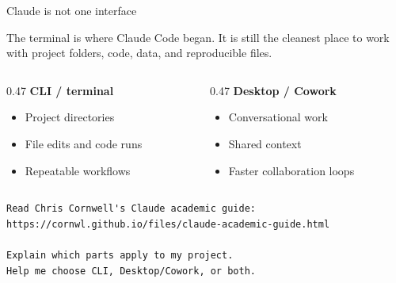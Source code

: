 \documentclass[aspectratio=169,11pt]{beamer}
\begin{document}
\begin{frame}[fragile]{Claude is not one interface}

The terminal is where Claude Code began. It is still the cleanest place to work with project folders, code, data, and reproducible files.

\vspace{0.25cm}

\begin{columns}[T]
\begin{column}{0.47\textwidth}
\textbf{CLI / terminal}
\begin{itemize}\setlength\itemsep{0.12em}
    \item Project directories
    \item File edits and code runs
    \item Repeatable workflows
\end{itemize}
\end{column}

\begin{column}{0.47\textwidth}
\textbf{Desktop / Cowork}
\begin{itemize}\setlength\itemsep{0.12em}
    \item Conversational work
    \item Shared context
    \item Faster collaboration loops
\end{itemize}
\end{column}
\end{columns}

\vspace{0.25cm}

\begin{verbatim}
Read Chris Cornwell's Claude academic guide:
https://cornwl.github.io/files/claude-academic-guide.html

Explain which parts apply to my project.
Help me choose CLI, Desktop/Cowork, or both.
\end{verbatim}

\end{frame}
\end{document}
